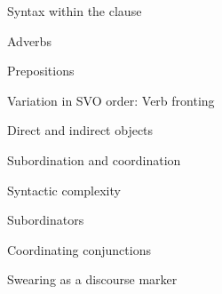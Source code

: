 \setcounter{listWWNumxleveli}{6}
\begin{listWWNumxleveli}
\item 

\setcounter{listWWNumxlevelii}{0}
\begin{listWWNumxlevelii}
\item 
\begin{styleListParagraph}
Syntax within the clause 
\end{styleListParagraph}


\setcounter{listWWNumxleveliii}{0}
\begin{listWWNumxleveliii}
\item 
\begin{styleListParagraph}
Adverbs
\end{styleListParagraph}
\item 
\begin{styleListParagraph}
Prepositions 
\end{styleListParagraph}
\item 
\begin{styleListParagraph}
Variation in SVO order: Verb fronting 
\end{styleListParagraph}
\item 
\begin{styleListParagraph}
Direct and indirect objects 
\end{styleListParagraph}
\end{listWWNumxleveliii}
\item 
\begin{styleListParagraph}
Subordination and coordination 
\end{styleListParagraph}


\setcounter{listWWNumxleveliii}{0}
\begin{listWWNumxleveliii}
\item 
\begin{styleListParagraph}
Syntactic complexity
\end{styleListParagraph}
\item 
\begin{styleListParagraph}
Subordinators
\end{styleListParagraph}
\item 
\begin{styleListParagraph}
Coordinating conjunctions 
\end{styleListParagraph}
\end{listWWNumxleveliii}
\item 
\begin{styleListParagraph}
Swearing as a discourse marker 
\end{styleListParagraph}



\end{listWWNumxlevelii}
\end{listWWNumxleveli}
